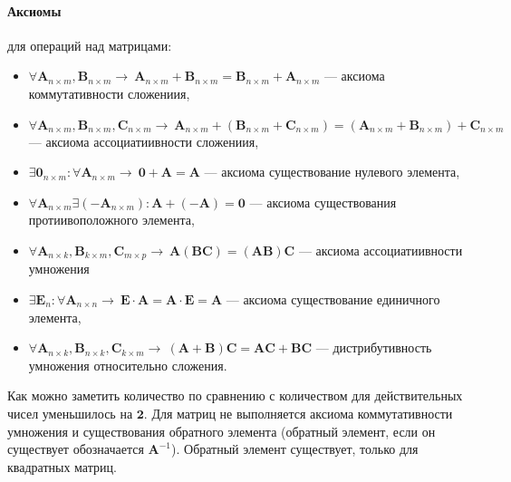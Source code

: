 \documentclass[12pt, twoside]{article}
\begin{document}
\paragraph{Аксиомы} для операций над матрицами:
\begin{itemize}
	\item $\forall \textbf{A}_{n\times m}, \textbf{B}_{n\times m} \rightarrow~\textbf{A}_{n\times m}+\textbf{B}_{n\times m}=\textbf{B}_{n\times m}+\textbf{A}_{n\times m}$ --- аксиома коммутативности сложениия,
	
	\item $\forall \textbf{A}_{n\times m}, \textbf{B}_{n\times m}, \textbf{C}_{n\times m} \rightarrow~\textbf{A}_{n\times m}+(\textbf{B}_{n\times m}+\textbf{C}_{n\times m})=(\textbf{A}_{n\times m}+\textbf{B}_{n\times m})+\textbf{C}_{n\times m}$ --- аксиома ассоциатиивности сложениия,
	
	\item $\exists \textbf{0}_{n\times m}: \forall \textbf{A}_{n\times m} \rightarrow~\textbf{0}+\textbf{A} = \textbf{A}$ --- аксиома существование нулевого элемента,
	
	\item $\forall \textbf{A}_{n\times m} \exists (-\textbf{A}_{n\times m}): \textbf{A} + (-\textbf{A}) = \textbf{0}$ --- аксиома существования протиивоположного элемента,
	
	
	\item $\forall \textbf{A}_{n\times k}, \textbf{B}_{k\times m}, \textbf{C}_{m\times p} \rightarrow~\textbf{A}(\textbf{B}\textbf{C}) = (\textbf{A}\textbf{B})\textbf{C}$ --- аксиома ассоциатиивности умножения
	
	\item $\exists \textbf{E}_{n}: \forall \textbf{A}_{n\times n} \rightarrow~\textbf{E}\cdot\textbf{A} = \textbf{A}\cdot\textbf{E} = \textbf{A}$ --- аксиома существование единичного элемента,
	
	\item $\forall \textbf{A}_{n\times k}, \textbf{B}_{n\times k}, \textbf{C}_{k\times m} \rightarrow~ (\textbf{A} +\textbf{B})\textbf{C} = \textbf{A}\textbf{C} + \textbf{B}\textbf{C}$ --- дистрибутивность умножения относительно сложения.
\end{itemize}

Как можно заметить количество {} по сравнению с количеством {} для действительных чисел уменьшилось на $\textbf{2}$. Для матриц не выполняется аксиома коммутативности умножения и существования обратного элемента (обратный элемент, если он существует обозначается $\textbf{A}^{-1}$). Обратный элемент существует, только для квадратных матриц.
\end{document}
